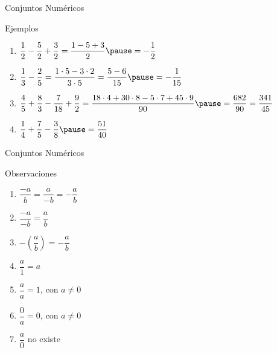 \documentclass[handout,10pt]{beamer}
\begin{document}
	\begin{frame}{Conjuntos Numéricos}
		\begin{block}{Ejemplos}
			\begin{enumerate}
				\item $\dfrac{1}{2}-\dfrac{5}{2}+\dfrac{3}{2}
				=
				\dfrac{1-5+3}{2}
				\pause
				=
				-\dfrac{1}{2}$
				\pause
				
				\item $\dfrac{1}{3}-\dfrac{2}{5}
				=
				\dfrac{1\cdot5-3\cdot2}{3\cdot5}
				=
				\dfrac{5-6}{15}
				\pause
				=
				-\dfrac{1}{15}$
				\pause
				
				\item $\dfrac{4}{5}+\dfrac{8}{3}-\dfrac{7}{18}+\dfrac{9}{2}
				=
				\dfrac{18\cdot4+30\cdot8-5\cdot7+45\cdot9}{90}
				\pause
				=
				\dfrac{682}{90}
				=
				\dfrac{341}{45}$
				\pause
				
				\item $\dfrac{1}{4}+\dfrac{7}{5}-\dfrac{3}{8}
				\pause
				=
				\dfrac{51}{40}$
			\end{enumerate}
		\end{block}
	\end{frame}
	
	\begin{frame}{Conjuntos Numéricos}
		\begin{block}{Observaciones}
			\begin{enumerate}
				\item $\dfrac{-a}{b}=\dfrac{a}{-b}=-\dfrac{a}{b}$
				\pause
				\item $\dfrac{-a}{-b}=\dfrac{a}{b}$
				\pause
				\item $-\left(\dfrac{a}{b}\right)=-\dfrac{a}{b}$
				\pause
				\item $\dfrac{a}{1}=a$
				\pause
				\item $\dfrac{a}{a}=1$, con $a\neq0$
				\pause
				\item $\dfrac{0}{a}=0$, con $a\neq0$
				\pause
				\item $\dfrac{a}{0}$ no existe
			\end{enumerate}
		\end{block}
	\end{frame}
	
\end{document}
